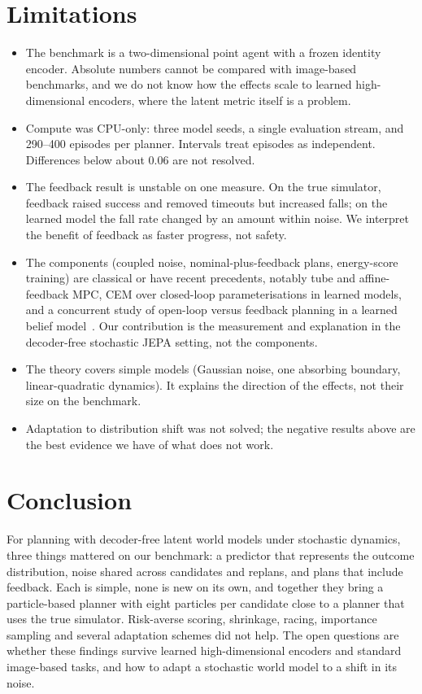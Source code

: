 \documentclass[preprint,12pt]{elsarticle}
\begin{document}
\section{Limitations}\label{sec:limits}
\begin{itemize}
\item The benchmark is a two-dimensional point agent with a frozen identity encoder. Absolute numbers cannot be compared with image-based benchmarks, and we do not know how the effects scale to learned high-dimensional encoders, where the latent metric itself is a problem.
\item Compute was CPU-only: three model seeds, a single evaluation stream, and 290--400 episodes per planner. Intervals treat episodes as independent. Differences below about 0.06 are not resolved.
\item The feedback result is unstable on one measure. On the true simulator, feedback raised success and removed timeouts but increased falls; on the learned model the fall rate changed by an amount within noise. We interpret the benefit of feedback as faster progress, not safety.
\item The components (coupled noise, nominal-plus-feedback plans, energy-score training) are classical or have recent precedents, notably tube and affine-feedback MPC, CEM over closed-loop parameterisations in learned models, and a concurrent study of open-loop versus feedback planning in a learned belief model~\cite{huh2026feedback}. Our contribution is the measurement and explanation in the decoder-free stochastic JEPA setting, not the components.
\item The theory covers simple models (Gaussian noise, one absorbing boundary, linear-quadratic dynamics). It explains the direction of the effects, not their size on the benchmark.
\item Adaptation to distribution shift was not solved; the negative results above are the best evidence we have of what does not work.
\end{itemize}

\section{Conclusion}\label{sec:conclusion}
For planning with decoder-free latent world models under stochastic dynamics, three things mattered on our benchmark: a predictor that represents the outcome distribution, noise shared across candidates and replans, and plans that include feedback.
Each is simple, none is new on its own, and together they bring a particle-based planner with eight particles per candidate close to a planner that uses the true simulator.
Risk-averse scoring, shrinkage, racing, importance sampling and several adaptation schemes did not help.
The open questions are whether these findings survive learned high-dimensional encoders and standard image-based tasks, and how to adapt a stochastic world model to a shift in its noise.
\end{document}
